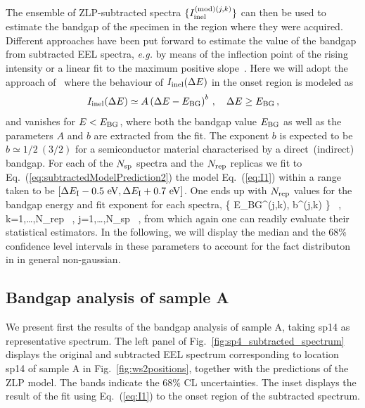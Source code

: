  The ensemble of ZLP-subtracted spectra $\{I_{\rm inel}^{({\rm mod})(j,k)} \} $
 can then be used to estimate the bandgap of the specimen in the region where
 they were acquired.
 Different approaches  have been put forward to estimate the value of the bandgap from 
subtracted EEL spectra, \textit{e.g.} by means of the inflection point of the rising intensity or
a linear fit to the maximum positive slope~\cite{Schamm:2003}.
%
Here we will adopt the approach of~\cite{Rafferty:2000} where the behaviour
of $I_{\rm inel}(\Delta E)$ in the onset region is modeled as
\begin{equation}
  \label{eq:I1}
    I_{\rm inel}(\Delta E) \simeq  A \left( \Delta E-E_{\rm BG} \right)^{b} \, , \quad \Delta E \ge E_{\rm BG} \, ,
\end{equation}
and vanishes for $E < E_{\rm BG}$, where both the bandgap value
$E_{\rm BG}$ as well as the parameters $A$ and $b$ are extracted from the fit.
%
The exponent $b$ is expected to be $b\simeq 1/2~(3/2)$ for a semiconductor material characterised
by a direct~(indirect) bandgap.
 For each of the $N_{\rm sp}$ spectra and the $N_{\rm rep}$ replicas
 we fit to Eq.~(\ref{eq:subtractedModelPrediction2}) the model Eq.~(\ref{eq:I1})
 within a range taken to be
 $\left[ \Delta E_{\rm I} - 0.5~{\rm eV}, \Delta E_{\rm I} + 0.7~{\rm eV}\right]$.
 One ends up with $N_{\rm rep}$ values for
 the bandgap energy and fit exponent for each spectra,
 \be
 \Big \{ E_{\rm BG}^{(j,k)}, b^{(j,k)} \Big\} \, , \quad k=1,\ldots,N_{\rm rep} \, ,
 \quad j=1,\ldots,N_{\rm sp} \, ,
 \ee
 from which again one can readily evaluate their statistical estimators.
 In the following, we will display the median and the 68\% confidence level intervals
 in these parameters to account for the fact distributon in in general non-gaussian.

 \subsection{Bandgap analysis of sample A}

 We present first the results of the bandgap analysis of sample A,
 taking sp14 as representative spectrum.
 The left panel of Fig.~\ref{fig:sp4_subtracted_spectrum} displays the original
  and subtracted EEL spectrum corresponding to location sp14 of sample A in Fig.~\ref{fig:ws2positions},
  together with the predictions of the ZLP model.
  The bands indicate the 68\% CL uncertainties.
  The inset displays the result of the fit using Eq.~(\ref{eq:I1}) to the onset
  region of the subtracted spectrum.

